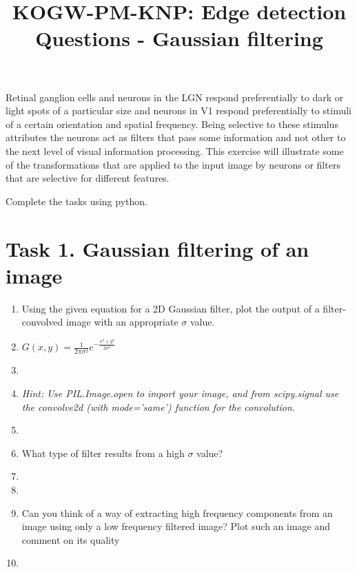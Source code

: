 \documentclass[12pt,english]{scrartcl}
\title{KOGW-PM-KNP: Edge detection Questions - Gaussian filtering}
\begin{document}
\maketitle
\raggedright
Retinal ganglion cells and neurons in the LGN respond preferentially to dark or light spots of a particular size and neurons in V1 respond preferentially to stimuli of a certain orientation and spatial frequency. Being selective to these stimulus attributes the neurons act as filters that pass some information and not other to the next level of visual information processing. This exercise will illustrate some of the transformations that are applied to the input image by neurons or filters that are selective for different features.
 
Complete the tasks using python. 

\section*{Task 1. Gaussian filtering of an image}

\begin{enumerate}
 \item Using the given equation for a 2D Gaussian filter, plot the output of a filter-convolved image with an appropriate $\sigma$ value. \\
 \item[]
 \centering
 $G(x,y) = \frac{1}{2\pi\sigma^2} e^{-\frac{x^2+y^2}{2\sigma^2}}$
 \item[]
 \raggedright
 \color{black}
 \item[] \textit{Hint: Use PIL.Image.open to import your image, and from scipy.signal use the convolve2d (with mode='same') function for the convolution.} \\
 \item[]

 \color{black} 
 \item What type of filter results from a high $\sigma$ value? \\
 \item[]
 \item[]

 \color{black}
 \item Can you think of a way of extracting high frequency components from an image using only a low frequency filtered image? Plot such an image and comment on its quality
 \item[]

 \end{enumerate}
\end{document}
